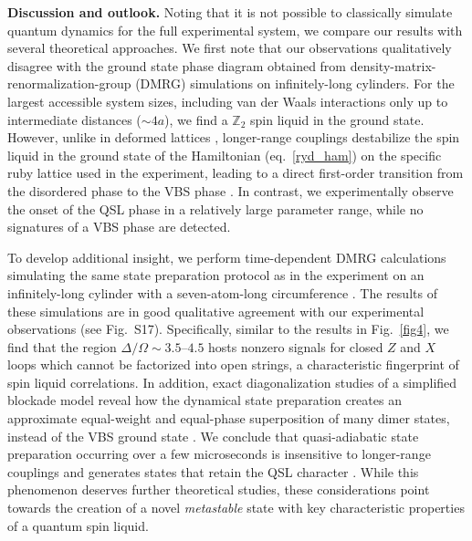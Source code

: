 \documentclass[twocolumn,amssymb,secnumarabic, prl, aps, nofootinbib]{revtex4-1}
\begin{document}
\noindent \textbf{Discussion and outlook.}
Noting that it is not possible to classically simulate quantum dynamics for the full experimental system,
we compare our results with several theoretical approaches. We first note that our observations qualitatively disagree with the  ground state phase diagram obtained from 
density-matrix-renormalization-group (DMRG) \cite{White92,Hauschild18} simulations on infinitely-long cylinders. %
For the largest accessible system sizes, including van der Waals interactions only up to intermediate distances ($\sim 4a$), we find a $\mathbb Z_2$ spin liquid in the ground state. However, unlike in deformed lattices \cite{Ruben2020}, longer-range couplings destabilize the spin liquid in the ground state of the Hamiltonian (eq.~\eqref{ryd_ham}) on the specific ruby lattice used in the experiment, 
leading to a direct first-order transition from the disordered phase to the VBS phase \cite{Supplement}. In contrast, we experimentally observe the onset of the QSL phase in a relatively large parameter range, 
while no signatures of a VBS phase are detected. 

To develop additional insight, we perform time-dependent DMRG calculations \cite{White92,Zaletel15,Hauschild18} simulating the same state preparation protocol as in the experiment on an infinitely-long cylinder with a seven-atom-long circumference \cite{Supplement}. The results of these simulations are in good qualitative agreement with our experimental observations (see Fig.~S17). 
Specifically, similar to the results in Fig.~\ref{fig4}, we find that the region $\Delta/\Omega \sim 3.5–4.5$ hosts nonzero signals for closed $Z$ and $X$ loops which cannot be factorized into open strings, a characteristic fingerprint of spin liquid correlations.
In addition, exact diagonalization studies of a simplified blockade model reveal how the dynamical state preparation creates an approximate equal-weight and equal-phase superposition of many dimer states, instead of the VBS ground state \cite{Supplement}.
We conclude that quasi-adiabatic state preparation occurring over a few microseconds
is insensitive to longer-range couplings and generates states that retain the QSL character \cite{Supplement}. 
While this phenomenon deserves further theoretical studies, these considerations point towards the creation of a novel {\it metastable} state with key characteristic properties of a quantum spin liquid. 
\end{document}
